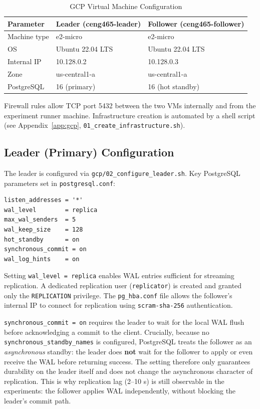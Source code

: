 \documentclass[12pt,a4paper]{article}
\begin{document}
\begin{table}[H]
\centering
\caption{GCP Virtual Machine Configuration}
\begin{tabular}{lll}
\toprule
\textbf{Parameter} & \textbf{Leader (ceng465-leader)} & \textbf{Follower (ceng465-follower)} \\
\midrule
Machine type & e2-micro & e2-micro \\
OS & Ubuntu 22.04 LTS & Ubuntu 22.04 LTS \\
Internal IP & 10.128.0.2 & 10.128.0.3 \\
Zone & us-central1-a & us-central1-a \\
PostgreSQL & 16 (primary) & 16 (hot standby) \\
\bottomrule
\end{tabular}
\end{table}

Firewall rules allow TCP port 5432 between the two VMs internally and from the
experiment runner machine. Infrastructure creation is automated by a shell script
(see Appendix~\ref{app:gcp}, \texttt{01\_create\_infrastructure.sh}).

\subsection{Leader (Primary) Configuration}

The leader is configured via \texttt{gcp/02\_configure\_leader.sh}. Key PostgreSQL
parameters set in \texttt{postgresql.conf}:

\begin{lstlisting}[style=bashstyle, caption={Leader PostgreSQL parameters}]
listen_addresses = '*'
wal_level        = replica
max_wal_senders  = 5
wal_keep_size    = 128
hot_standby      = on
synchronous_commit = on
wal_log_hints    = on
\end{lstlisting}

Setting \texttt{wal\_level = replica} enables WAL entries sufficient for streaming
replication. A dedicated replication user (\texttt{replicator}) is created and
granted only the \texttt{REPLICATION} privilege. The \texttt{pg\_hba.conf} file
allows the follower's internal IP to connect for replication using
\texttt{scram-sha-256} authentication.

\texttt{synchronous\_commit = on} requires the leader to wait for the local WAL
flush before acknowledging a commit to the client. Crucially, because no
\texttt{synchronous\_standby\_names} is configured, PostgreSQL treats the follower
as an \textit{asynchronous} standby: the leader does \textbf{not} wait for the
follower to apply or even receive the WAL before returning success. The setting
therefore only guarantees durability on the leader itself and does not change
the asynchronous character of replication. This is why replication lag (2--10 s)
is still observable in the experiments: the follower applies WAL independently,
without blocking the leader's commit path.
\end{document}
